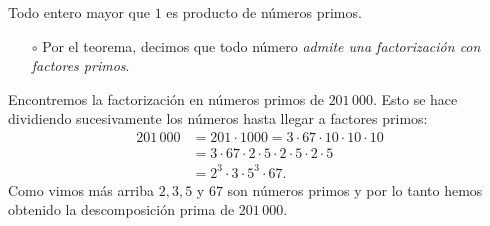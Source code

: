 \documentclass{beamer}
\begin{document}
    
    \begin{frame}
        \begin{teorema}
            Todo  entero  mayor que $1$ es producto de números primos. 
        \end{teorema}  
        \pause
        



    \end{frame}
    
    
    \begin{frame}

        \begin{observacion}
			\begin{itemize}
				\item[$\circ$] Por el teorema,  decimos que todo número  \textit{admite una factorización con factores primos}.
			\end{itemize}
			
		\end{observacion}
        \pause
        \begin{ejemplo} 
            Encontremos la factorización en números primos de $201\,000$. Esto se hace di\-vi\-dien\-do  sucesivamente los números hasta llegar a factores primos:\pause
            \begin{align*}
                201\,000 &= 201\cdot 1000 = 3\cdot 67\cdot 10\cdot 10\cdot 10\\ &=  3\cdot 67\cdot 2\cdot 5 \cdot 2\cdot 5 \cdot 2\cdot 5 \\&= 2^3\cdot 3\cdot 5^3\cdot 67.
            \end{align*}
            Como vimos más arriba $2, 3, 5$ y $67$ son  números primos y por lo tanto hemos obtenido la descomposición prima de $201\,000$.
        \end{ejemplo}
    \end{frame}
    
\end{document}
